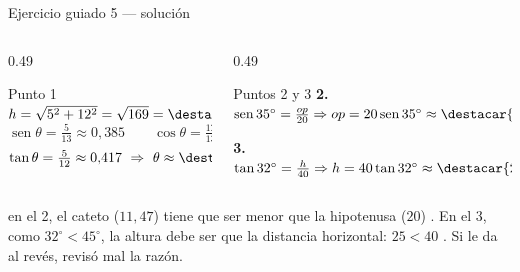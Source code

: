 \documentclass[aspectratio=169,10pt]{beamer}
\begin{document}
\begin{frame}{Ejercicio guiado 5 — solución}
  \scriptsize
  \begin{columns}[T,onlytextwidth]
    \begin{column}{0.49\textwidth}
      \begin{block}{Punto 1}
        \tiny
        $h=\sqrt{5^{2}+12^{2}}=\sqrt{169}=\destacar{13}$
        \[ \operatorname{sen}\theta=\tfrac{5}{13}\approx 0{,}385 \qquad
           \cos\theta=\tfrac{12}{13}\approx 0{,}923 \]
        \[ \tan\theta=\tfrac{5}{12}\approx 0{,}417
           \ \Rightarrow\ \theta \approx \destacar{22{,}62^{\circ}} \]
      \end{block}
    \end{column}
    \begin{column}{0.49\textwidth}
      \begin{block}{Puntos 2 y 3}
        \tiny
        \textbf{2.} $\operatorname{sen}35^{\circ}=\frac{op}{20}
        \Rightarrow op = 20\operatorname{sen}35^{\circ}
        \approx \destacar{11{,}47}$

        \vspace{0.12cm}
        \textbf{3.} $\tan 32^{\circ}=\frac{h}{40}
        \Rightarrow h = 40\tan 32^{\circ}
        \approx \destacar{25{,}0\ \text{m}}$
      \end{block}
    \end{column}
  \end{columns}

  \vspace{0.1cm}
  {\tiny\color{uniGris}  en el 2, el cateto
  ($11{,}47$) tiene que ser menor que la hipotenusa ($20$) \checkmark. En el 3,
  como $32^{\circ}<45^{\circ}$, la altura debe ser  que la
  distancia horizontal: $25<40$ \checkmark. Si le da al revés, revisó mal la
  razón.}
\end{frame}
\end{document}
